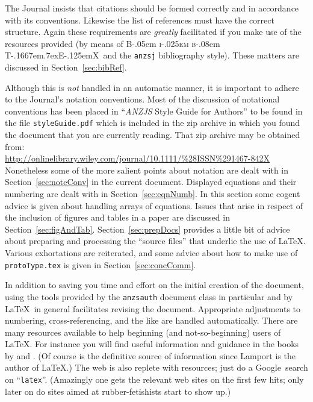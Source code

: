 \documentclass[times, doublespace]{anzsauth}
\newcommand\BibTeX{{\rmfamily B\kern-.05em \textsc{i\kern-.025em b}\kern-.08em
T\kern-.1667em\lower.7ex\hbox{E}\kern-.125emX}}
\begin{document}
The Journal insists that citations should be formed correctly and in
accordance with its conventions.  Likewise the list of references
must have the correct structure.  Again these requirements are
\emph{greatly} facilitated if you make use of the resources provided
(by means of \BibTeX\ and the \texttt{anzsj} bibliography style).
These matters are discussed in Section~\ref{sec:bibRef}.

Although this is \emph{not} handled in an automatic manner, it
is important to adhere to the Journal's notation conventions.
Most of the discussion of notational conventions has been placed
in ``{\textit{ANZJS} Style Guide for Authors}''
to be found in the file \texttt{styleGuide.pdf}
which is included in the zip archive in which you found the document
that you are currently reading.  That zip archive may be obtained
from:\\
{\small
\url{http://onlinelibrary.wiley.com/journal/10.1111/%28ISSN%291467-842X}
}
\noindent
Nonetheless some of the more salient points about notation are
dealt with in Section~\ref{sec:noteConv} in the current document.
Displayed equations and their numbering are dealt with in
Section~\ref{sec:eqnNumb}.  In this section some cogent advice
is given about handling arrays of equations.  Issues that arise
in respect of the inclusion of figures and tables in a paper are
discussed in Section~\ref{sec:figAndTab}.  Section~\ref{sec:prepDocs}
provides a little bit of advice about preparing and processing
the ``source files'' that underlie the use of \LaTeX.  Various
exhortations are reiterated, and some advice about how to make use
of \texttt{protoType.tex} is given in Section~\ref{sec:concComm}.

In addition to saving you time and effort on the initial creation
of the document, using the tools provided by the \texttt{anzsauth}
document class in particular and by \LaTeX\ in general facilitates
revising the document.  Appropriate adjustments to numbering,
cross-referencing, and the like are handled automatically.
There are many resources available to help beginning (and
not-so-beginning) users of \LaTeX.  For instance you will find
useful information and guidance in the books by \cite{KopkaDaly2003,
Lamport1994} and \cite{MittelbachGoossens2004}.  (Of course \cite{Lamport1994}
is the definitive source of information since Lamport is the
author of \LaTeX.)  The web is also replete with resources;
just do a Google\texttrademark\ search on ``\texttt{latex}''.
(Amazingly one gets the relevant web sites on the first few hits;
only later on do sites aimed at rubber-fetishists start to show up.)
\end{document}
